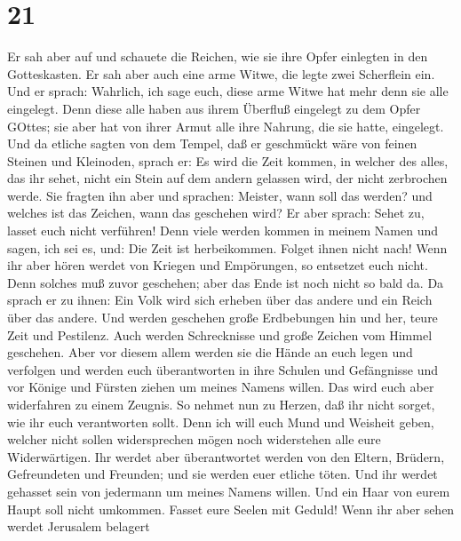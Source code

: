 \hypertarget{section-20}{%
\section{21}\label{section-20}}

 Er sah aber auf und schauete die Reichen, wie sie ihre
Opfer einlegten in den Gotteskasten.  Er sah aber auch eine
arme Witwe, die legte zwei Scherflein ein.  Und er sprach:
Wahrlich, ich sage euch, diese arme Witwe hat mehr denn sie alle
eingelegt.  Denn diese alle haben aus ihrem Überfluß
eingelegt zu dem Opfer GOttes; sie aber hat von ihrer Armut alle ihre
Nahrung, die sie hatte, eingelegt.  Und da etliche sagten
von dem Tempel, daß er geschmückt wäre von feinen Steinen und Kleinoden,
sprach er:  Es wird die Zeit kommen, in welcher des alles,
das ihr sehet, nicht ein Stein auf dem andern gelassen wird, der nicht
zerbrochen werde.  Sie fragten ihn aber und sprachen:
Meister, wann soll das werden? und welches ist das Zeichen, wann das
geschehen wird?  Er aber sprach: Sehet zu, lasset euch nicht
verführen! Denn viele werden kommen in meinem Namen und sagen, ich sei
es, und: Die Zeit ist herbeikommen. Folget ihnen nicht nach!
 Wenn ihr aber hören werdet von Kriegen und Empörungen, so
entsetzet euch nicht. Denn solches muß zuvor geschehen; aber das Ende
ist noch nicht so bald da.  Da sprach er zu ihnen: Ein Volk
wird sich erheben über das andere und ein Reich über das andere.
 Und werden geschehen große Erdbebungen hin und her, teure
Zeit und Pestilenz. Auch werden Schrecknisse und große Zeichen vom
Himmel geschehen.  Aber vor diesem allem werden sie die
Hände an euch legen und verfolgen und werden euch überantworten in ihre
Schulen und Gefängnisse und vor Könige und Fürsten ziehen um meines
Namens willen.  Das wird euch aber widerfahren zu einem
Zeugnis.  So nehmet nun zu Herzen, daß ihr nicht sorget,
wie ihr euch verantworten sollt.  Denn ich will euch Mund
und Weisheit geben, welcher nicht sollen widersprechen mögen noch
widerstehen alle eure Widerwärtigen.  Ihr werdet aber
überantwortet werden von den Eltern, Brüdern, Gefreundeten und Freunden;
und sie werden euer etliche töten.  Und ihr werdet gehasset
sein von jedermann um meines Namens willen.  Und ein Haar
von eurem Haupt soll nicht umkommen.  Fasset eure Seelen
mit Geduld!  Wenn ihr aber sehen werdet Jerusalem belagert
